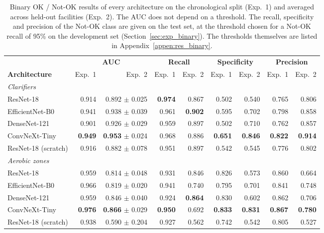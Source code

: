 \begin{table}[htbp]
\centering
\setlength{\tabcolsep}{3.5pt}
\caption{Binary OK / Not-OK results of every architecture on the chronological split (Exp.~1) and averaged across held-out facilities (Exp.~2). The AUC does not depend on a threshold. The recall, specificity and precision of the Not-OK class are given on the test set, at the threshold chosen for a Not-OK recall of 95\% on the development set (Section~\ref{sec:exp_binary}). The thresholds themselves are listed in Appendix~\ref{appen:res_binary}.}
\label{tab:res_binary}
\begin{tabular}{l rr rr rr rr}
\toprule
& \multicolumn{2}{c}{\textbf{AUC}} & \multicolumn{2}{c}{\textbf{Recall}} & \multicolumn{2}{c}{\textbf{Specificity}} & \multicolumn{2}{c}{\textbf{Precision}} \\
\cmidrule(lr){2-3} \cmidrule(lr){4-5} \cmidrule(lr){6-7} \cmidrule(lr){8-9}
\textbf{Architecture} & Exp.~1 & Exp.~2 & Exp.~1 & Exp.~2 & Exp.~1 & Exp.~2 & Exp.~1 & Exp.~2 \\
\midrule
\multicolumn{9}{l}{\textit{Clarifiers}} \\
ResNet-18 & 0.914 & 0.892 $\pm$ 0.025 & \textbf{0.974} & 0.867 & 0.502 & 0.540 & 0.765 & 0.806 \\
EfficientNet-B0 & 0.941 & 0.938 $\pm$ 0.039 & 0.961 & \textbf{0.902} & 0.595 & 0.702 & 0.798 & 0.858 \\
DenseNet-121 & 0.901 & 0.926 $\pm$ 0.029 & 0.959 & 0.897 & 0.502 & 0.710 & 0.762 & 0.857 \\
ConvNeXt-Tiny & \textbf{0.949} & \textbf{0.953} $\pm$ 0.024 & 0.968 & 0.886 & \textbf{0.651} & \textbf{0.846} & \textbf{0.822} & \textbf{0.914} \\
ResNet-18 (scratch) & 0.916 & 0.882 $\pm$ 0.078 & 0.951 & 0.897 & 0.542 & 0.545 & 0.776 & 0.802 \\
\midrule
\multicolumn{9}{l}{\textit{Aerobic zones}} \\
ResNet-18 & 0.959 & 0.814 $\pm$ 0.048 & 0.931 & 0.846 & 0.826 & 0.573 & 0.860 & 0.664 \\
EfficientNet-B0 & 0.966 & 0.819 $\pm$ 0.020 & 0.941 & 0.740 & 0.795 & 0.701 & 0.841 & 0.748 \\
DenseNet-121 & 0.959 & 0.846 $\pm$ 0.040 & 0.924 & \textbf{0.864} & 0.830 & 0.602 & 0.862 & 0.706 \\
ConvNeXt-Tiny & \textbf{0.976} & \textbf{0.866} $\pm$ 0.029 & \textbf{0.950} & 0.692 & \textbf{0.833} & \textbf{0.831} & \textbf{0.867} & \textbf{0.780} \\
ResNet-18 (scratch) & 0.938 & 0.590 $\pm$ 0.204 & 0.927 & 0.562 & 0.742 & 0.542 & 0.805 & 0.527 \\
\bottomrule
\end{tabular}
\end{table}



